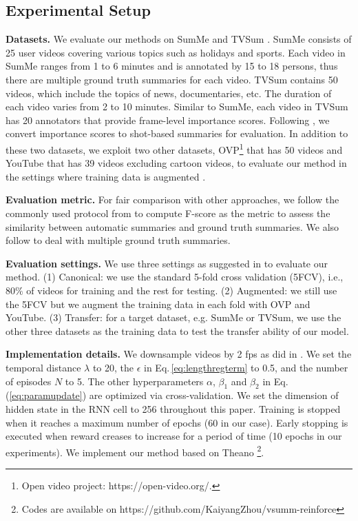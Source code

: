 \documentclass[letterpaper]{article} \usepackage{aaai18}  \usepackage{times}  \usepackage{helvet}  \usepackage{courier}  \usepackage{url}  \usepackage{graphicx}
\begin{document}
\subsection{Experimental Setup}
{\bf Datasets.} We evaluate our methods on SumMe \cite{gygli2014creating} and TVSum \cite{song2015tvsum}. SumMe consists of 25 user videos covering various topics such as holidays and sports. Each video in SumMe ranges from 1 to 6 minutes and is annotated by 15 to 18 persons, thus there are multiple ground truth summaries for each video. TVSum contains 50 videos, which include the topics of news, documentaries, etc. The duration of each video varies from 2 to 10 minutes. Similar to SumMe, each video in TVSum has 20 annotators that provide frame-level importance scores. Following \cite{song2015tvsum,zhang2016video}, we convert importance scores to shot-based summaries for evaluation. In addition to these two datasets, we exploit two other datasets, OVP\footnote{Open video project: https://open-video.org/.} that has 50 videos and YouTube \cite{de2011vsumm} that has 39 videos excluding cartoon videos, to evaluate our method in the settings where training data is augmented \cite{zhang2016video,mahasseniunsupervised}.

{\bf Evaluation metric.} For fair comparison with other approaches, we follow the commonly used protocol from \cite{zhang2016video} to compute F-score as the metric to assess the similarity between automatic summaries and ground truth summaries. We also follow \cite{zhang2016video} to deal with multiple ground truth summaries.

{\bf Evaluation settings.} We use three settings as suggested in \cite{zhang2016video} to evaluate our method. (1) Canonical: we use the standard 5-fold cross validation (5FCV), i.e., 80$\%$ of videos for training and the rest for testing. (2) Augmented: we still use the 5FCV but we augment the training data in each fold with OVP and YouTube. (3) Transfer: for a target dataset, e.g. SumMe or TVSum, we use the other three datasets as the training data to test the transfer ability of our model. 

{\bf Implementation details.} We downsample videos by 2 fps as did in \cite{zhang2016video}. We set the temporal distance $\lambda$ to 20, the $\epsilon$ in Eq.\,\ref{eq:lengthregterm} to 0.5, and the number of episodes $N$ to 5. The other hyperparameters $\alpha$, $\beta_1$ and $\beta_2$ in Eq.\,(\ref{eq:paramupdate}) are optimized via cross-validation. We set the dimension of hidden state in the RNN cell to 256 throughout this paper. Training is stopped when it reaches a maximum number of epochs (60 in our case). Early stopping is executed when reward creases to increase for a period of time (10 epochs in our experiments). We implement our method based on Theano \cite{al2016theano}\footnote{Codes are available on https://github.com/KaiyangZhou/vsumm-reinforce}.
\end{document}
